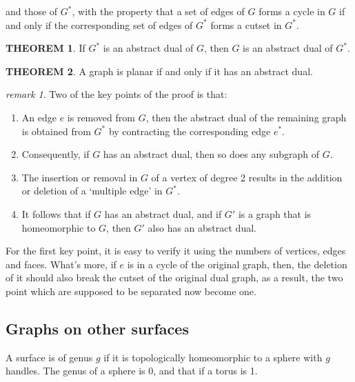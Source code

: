 \documentclass[a4paper,11pt]{article}%
\theoremstyle{remark}
\newtheorem*{remark}{remark}
\theoremstyle{definition}
\newtheorem{theorem}{THEOREM}[section]
\theoremstyle{definition}
\theoremstyle{definition}
\theoremstyle{definition}
\theoremstyle{plain}
\theoremstyle{definition}
\begin{document}
and those of $G^*$, with the property that a set of edges of $G$ forms a cycle in $G$ if and only if the corresponding set of edges of $G^*$
forms a cutset in $G^*$.
\begin{theorem}
    If $G^*$ is an abstract dual of $G$, then $G$ is an abstract dual of $G^*$.
\end{theorem}
\begin{theorem}
    A graph is planar if and only if it has an abstract dual.
\end{theorem}
\begin{remark}
    Two of the key points of the proof is that:
    \begin{enumerate}
        \item An edge $e$ is removed from $G$, then the abstract dual of the remaining graph is obtained from $G^*$ by contracting the corresponding edge $e^*$.
        \item Consequently, if $G$ has an abstract dual, then so does any subgraph of $G$.
        \item The insertion or removal in $G$ of a vertex of degree 2 results in the addition or deletion of a `multiple edge' in $G^*$.
        \item It follows that if $G$ has an abstract dual, and if $G'$ is a graph that is homeomorphic to $G$, then $G'$ also has an abstract dual.  
    \end{enumerate}
    For the first key point, it is easy to verify it using the numbers of vertices, edges and faces.
    What's more, if $e$ is in a cycle of the original graph, then, the deletion of it should also break the cutset of the original dual graph,
    as a result, the two point which are supposed to be separated now become one.
\end{remark}
\subsection{Graphs on other surfaces}
A surface is of genus $g$ if it is topologically homeomorphic to a sphere with $g$ handles.
The genus of a sphere is 0, and that if a torus is 1.
\end{document}
